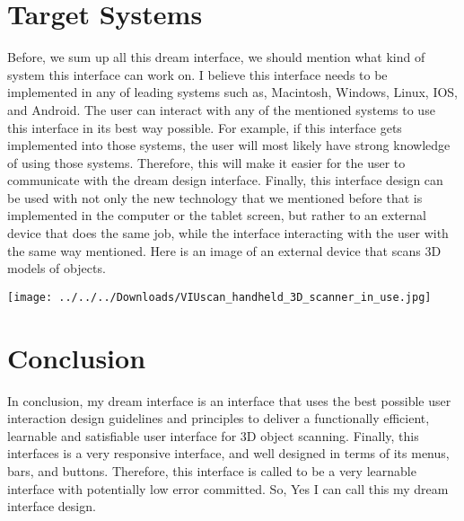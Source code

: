 \documentclass[12pt, oneside]{amsart}   	%
\begin{document}
\section{Target Systems}

Before, we sum up all this dream interface, we should mention what kind of system this interface can work on.  I believe this interface needs to be implemented in any of leading systems such as, Macintosh, Windows, Linux, IOS, and Android.  The user can interact with any of the mentioned systems to use this interface in its best way possible.  For example, if this interface gets implemented into those systems, the user will most likely have strong knowledge of using those systems.  Therefore, this will make it easier for the user to communicate with the dream design interface.  Finally, this interface design can be used with not only the new technology that we mentioned before that is implemented in the computer or the tablet screen, but rather to an external device that does the same job, while the interface interacting with the user with the same way mentioned.
Here is an image of an external device that scans 3D models of objects\cite{BeforeLast}.

\texttt{[image: ../../../Downloads/VIUscan\_handheld\_3D\_scanner\_in\_use.jpg]}


\section{Conclusion}

In conclusion, my dream interface is an interface that uses the best possible user interaction design guidelines and principles to deliver a functionally efficient, learnable and satisfiable user interface for 3D object scanning. 
Finally, this interfaces is a very responsive interface, and well designed in terms of its menus, bars, and buttons. Therefore, this interface is called to be a very learnable interface with potentially low error committed.  So, Yes I can call this my dream interface design.
 

\end{document}
